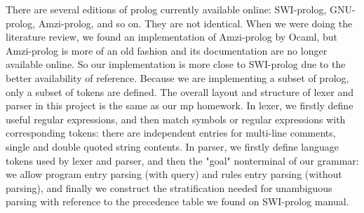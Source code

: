 There are several editions of prolog currently available online: SWI-prolog\cite{swi}, GNU-prolog\cite{gprolog}, Amzi-prolog\cite{amzi}, and so on. They are not identical. When we were doing the literature review, we found an implementation of Amzi-prolog by Ocaml, but Amzi-prolog is more of an old fashion and its documentation are no longer available online. So our implementation is more close to SWI-prolog due to the better availability of reference. Because we are implementing a subset of prolog, only a subset of tokens are defined.
The overall layout and structure of lexer and parser in this project is the same as our mp homework. In lexer, we firstly define useful regular expressions, and then match symbols or regular expressions with corresponding tokens: there are independent entries for multi-line comments, single and double quoted string contents. In parser, we firstly define language tokens used by lexer and parser, and then the "goal" nonterminal of our grammar: we allow program entry parsing (with query) and rules entry parsing (without parsing), and finally we construct the stratification needed for unambiguous parsing with reference to the precedence table we found on SWI-prolog manual.

